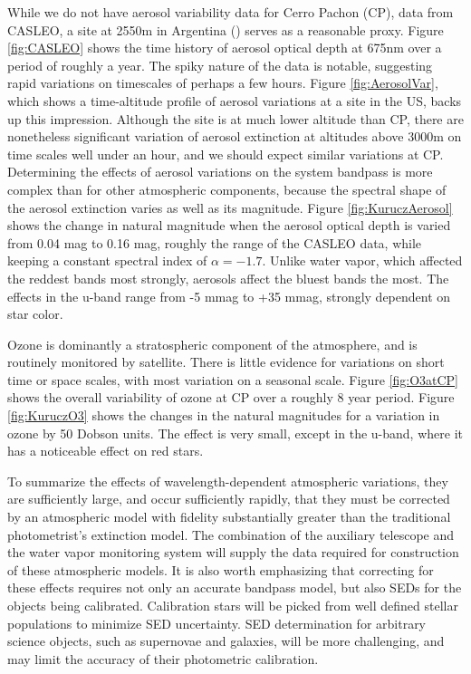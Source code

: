 \documentclass[12pt,preprint]{aastex}
\begin{document}
While we do not have aerosol variability data for Cerro Pachon (CP), data from CASLEO, a site at 2550m in Argentina (\citep{CASLEO}) serves as a reasonable proxy.  Figure \ref{fig:CASLEO} shows the time history of aerosol optical depth at 675nm over a period of roughly a year.  The spiky nature of the data is notable, suggesting rapid variations on timescales of perhaps a few hours.  Figure \ref{fig:AerosolVar}, which shows a time-altitude profile of aerosol variations at a site in the US, backs up this impression.  Although the site is at much lower altitude than CP, there are nonetheless significant variation of aerosol extinction at altitudes above 3000m on time scales well under an hour, and we should expect similar variations at CP.  Determining the effects of aerosol variations on the system bandpass is more complex than for other atmospheric components, because the spectral shape of the aerosol extinction varies as well as its magnitude.  Figure \ref{fig:KuruczAerosol} shows the change in natural magnitude when the aerosol optical depth is varied from 0.04 mag to 0.16 mag, roughly the range of the CASLEO data, while keeping a constant spectral index of $\alpha = -1.7$.  Unlike water vapor, which affected the reddest bands most strongly, aerosols affect the bluest bands the most.  The effects in the u-band range from -5 mmag to +35 mmag, strongly dependent on star color.

Ozone is dominantly a stratospheric component of the atmosphere, and is routinely monitored by satellite.   There is little evidence for variations on short time or space scales, with most variation on a seasonal scale.   Figure \ref{fig:O3atCP} shows the overall variability of ozone at CP over a roughly 8 year period.  Figure \ref{fig:KuruczO3} shows the changes in the natural magnitudes for a variation in ozone by 50 Dobson units.   The effect is very small, except in the u-band, where it has a noticeable effect on red stars.

To summarize the effects of wavelength-dependent atmospheric variations, they are sufficiently large, and occur sufficiently rapidly, that they must be corrected by an atmospheric model with fidelity substantially greater than the traditional photometrist's extinction model.   The combination of the auxiliary telescope and the water vapor monitoring system will supply the data required for construction of these atmospheric models.  It is also worth emphasizing that correcting for these effects requires not only an accurate bandpass model, but also SEDs for the objects being calibrated.   Calibration stars will be picked from well defined stellar populations to minimize SED uncertainty.   SED determination for arbitrary science objects, such as supernovae and galaxies, will be more challenging, and may limit the accuracy of their photometric calibration.
\end{document}
